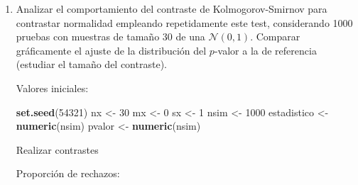 \documentclass[
]{book}
\newenvironment{Shaded}{\begin{snugshade}}{\end{snugshade}}
\newcommand{\CharTok}[1]{\textcolor[rgb]{0.31,0.60,0.02}{#1}}
\newcommand{\ControlFlowTok}[1]{\textcolor[rgb]{0.13,0.29,0.53}{\textbf{#1}}}
\newcommand{\DecValTok}[1]{\textcolor[rgb]{0.00,0.00,0.81}{#1}}
\newcommand{\FloatTok}[1]{\textcolor[rgb]{0.00,0.00,0.81}{#1}}
\newcommand{\KeywordTok}[1]{\textcolor[rgb]{0.13,0.29,0.53}{\textbf{#1}}}
\newcommand{\NormalTok}[1]{#1}
\newcommand{\OperatorTok}[1]{\textcolor[rgb]{0.81,0.36,0.00}{\textbf{#1}}}
\newcommand{\StringTok}[1]{\textcolor[rgb]{0.31,0.60,0.02}{#1}}
\theoremstyle{break}
\theoremstyle{definition}
\theoremstyle{definition}
\theoremstyle{definition}
\theoremstyle{remark}
\begin{document}
\begin{enumerate}
\def\labelenumi{\alph{enumi})}
\item
  Analizar el comportamiento del contraste de Kolmogorov-Smirnov
  para contrastar normalidad empleando repetidamente este test,
  considerando 1000 pruebas con muestras de tamaño 30 de
  una \(\mathcal{N}(0,1)\). Comparar gráficamente el ajuste
  de la distribución del \(p\)-valor a la de referencia
  (estudiar el tamaño del contraste).

  Valores iniciales:

\begin{Shaded}
\begin{Highlighting}[]
\KeywordTok{set.seed}\NormalTok{(}\DecValTok{54321}\NormalTok{)}
\NormalTok{nx <-}\StringTok{ }\DecValTok{30}
\NormalTok{mx <-}\StringTok{ }\DecValTok{0}
\NormalTok{sx <-}\StringTok{ }\DecValTok{1}
\NormalTok{nsim <-}\StringTok{ }\DecValTok{1000}
\NormalTok{estadistico <-}\StringTok{ }\KeywordTok{numeric}\NormalTok{(nsim)}
\NormalTok{pvalor <-}\StringTok{ }\KeywordTok{numeric}\NormalTok{(nsim)}
\end{Highlighting}
\end{Shaded}

  Realizar contrastes

\begin{Shaded}
\end{Shaded}

  Proporción de rechazos:

\begin{Shaded}
\end{Shaded}


\end{enumerate}
\end{document}
